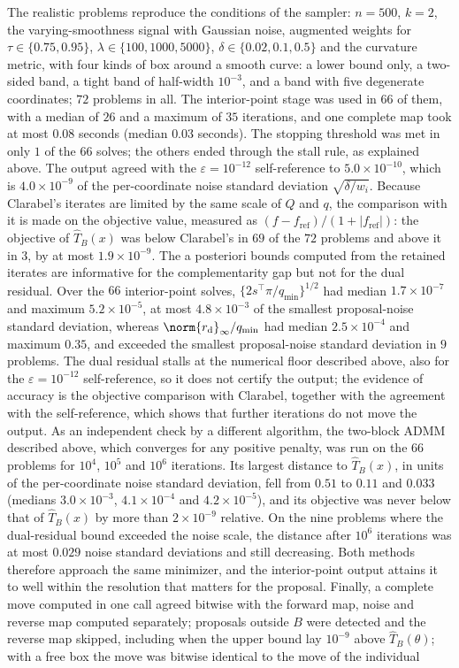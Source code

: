The realistic problems reproduce the conditions of the sampler: $n = 500$, $k = 2$, the varying-smoothness signal with Gaussian noise, augmented weights for $\tau \in \{0.75, 0.95\}$, $\lambda \in \{100, 1000, 5000\}$, $\delta \in \{0.02, 0.1, 0.5\}$ and the curvature metric, with four kinds of box around a smooth curve: a lower bound only, a two-sided band, a tight band of half-width $10^{-3}$, and a band with five degenerate coordinates; $72$ problems in all. The interior-point stage was used in $66$ of them, with a median of $26$ and a maximum of $35$ iterations, and one complete map took at most $0.08$ seconds (median $0.03$ seconds). The stopping threshold was met in only $1$ of the $66$ solves; the others ended through the stall rule, as explained above. The output agreed with the $\varepsilon = 10^{-12}$ self-reference to $5.0\times10^{-10}$, which is $4.0\times10^{-9}$ of the per-coordinate noise standard deviation $\sqrt{\delta/w_i}$. Because Clarabel's iterates are limited by the same scale of $Q$ and $q$, the comparison with it is made on the objective value, measured as $(f - f_{\mathrm{ref}})/(1 + |f_{\mathrm{ref}}|)$: the objective of $\widehat T_B(x)$ was below Clarabel's in $69$ of the $72$ problems and above it in $3$, by at most $1.9\times10^{-9}$. The a posteriori bounds computed from the retained iterates are informative for the complementarity gap but not for the dual residual. Over the $66$ interior-point solves, $\{2s^\top\pi/q_{\min}\}^{1/2}$ had median $1.7\times10^{-7}$ and maximum $5.2\times10^{-5}$, at most $4.8\times10^{-3}$ of the smallest proposal-noise standard deviation, whereas $\norm{r_{\mathrm d}}_\infty/q_{\min}$ had median $2.5\times10^{-4}$ and maximum $0.35$, and exceeded the smallest proposal-noise standard deviation in $9$ problems. The dual residual stalls at the numerical floor described above, also for the $\varepsilon = 10^{-12}$ self-reference, so it does not certify the output; the evidence of accuracy is the objective comparison with Clarabel, together with the agreement with the self-reference, which shows that further iterations do not move the output. As an independent check by a different algorithm, the two-block ADMM described above, which converges for any positive penalty, was run on the $66$ problems for $10^4$, $10^5$ and $10^6$ iterations. Its largest distance to $\widehat T_B(x)$, in units of the per-coordinate noise standard deviation, fell from $0.51$ to $0.11$ and $0.033$ (medians $3.0\times10^{-3}$, $4.1\times10^{-4}$ and $4.2\times10^{-5}$), and its objective was never below that of $\widehat T_B(x)$ by more than $2\times10^{-9}$ relative. On the nine problems where the dual-residual bound exceeded the noise scale, the distance after $10^6$ iterations was at most $0.029$ noise standard deviations and still decreasing. Both methods therefore approach the same minimizer, and the interior-point output attains it to well within the resolution that matters for the proposal. Finally, a complete move computed in one call agreed bitwise with the forward map, noise and reverse map computed separately; proposals outside $B$ were detected and the reverse map skipped, including when the upper bound lay $10^{-9}$ above $\widehat T_B(\theta)$; with a free box the move was bitwise identical to the move of the individual 